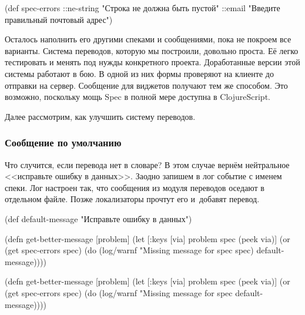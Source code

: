   \begin{clojure}
(def spec-errors
  {::ne-string "Строка не должна быть пустой"
   ::email "Введите правильный почтовый адрес"})
  \end{clojure}

\fi


Осталось наполнить его другими спеками и сообщениями, пока не покроем все
варианты. Система переводов, которую мы построили, довольно проста. Её легко
тестировать и менять под нужды конкретного проекта. Доработанные версии этой
системы работают в бою. В одной из них формы проверяют на клиенте до отправки на
сервер. Сообщение для виджетов получают тем же способом. Это возможно, поскольку
мощь Spec в полной мере доступна в ClojureScript.

Далее рассмотрим, как улучшить систему переводов.

\subsubsection{Сообщение по умолчанию}

Что случится, если перевода нет в словаре? В этом случае вернём нейтральное
<<исправьте ошибку в данных>>. Заодно запишем в лог событие с именем спеки. Лог
настроен так, что сообщения из модуля переводов оседают в отдельном файле. Позже
локализаторы прочтут его и~добавят перевод.

  \begin{clojure}
(def default-message
  "Исправьте ошибку в данных")
  \end{clojure}

\ifx\devicetype\mobile

\begin{english}
  \begin{clojure}
(defn get-better-message [problem]
  (let [{:keys [via]} problem
        spec (peek via)]
    (or (get spec-errors spec)
        (do
          (log/warnf
            "Missing message for spec %
            spec)
          default-message))))
  \end{clojure}
\end{english}

\else

\begin{english}
  \begin{clojure}
(defn get-better-message [problem]
  (let [{:keys [via]} problem
        spec (peek via)]
    (or (get spec-errors spec)
        (do (log/warnf "Missing message for spec %
            default-message))))
  \end{clojure}
\end{english}

